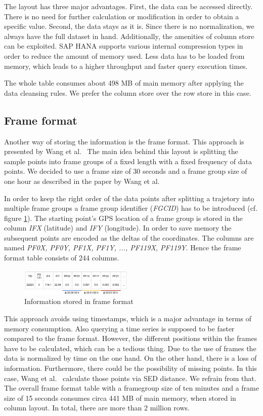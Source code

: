 \documentclass[10pt]{sig-alternate}
\begin{document}
The layout has three major advantages. First, the data can be accessed directly. There is no need for further calculation or modification in order to obtain a specific value. Second, the data stays as it is. Since there is no normalization, we always have the full dataset in hand. Additionally, the amenities of column store can be exploited. SAP HANA supports various internal compression types in order to reduce the amount of memory used. Less data has to be loaded from memory, which leads to a higher throughput and faster query execution times.

The whole table consumes about 498 MB of main memory after applying the data cleansing rules. We prefer the column store over the row store in this case.

\subsection{Frame format}
Another way of storing the information is the frame format. This approach is presented by Wang et al.~\cite{wang} The main idea behind this layout is splitting the sample points into frame groups of a fixed length with a fixed frequency of data points. We decided to use a frame size of 30 seconds and a frame group size of one hour as described in the paper by Wang et al.

In order to keep the right order of the data points after splitting a trajetory into multiple frame groups a frame group identifier (\textit{FGCID}) has to be introduced (cf. figure \ref{fig:frame_format}). The starting point's GPS location of a frame group is stored in the column \textit{IFX} (latitude) and \textit{IFY} (longitude). In order to save memory the subsequent points are encoded as the deltas of the coordinates. The columns are named \textit{PF0X, PF0Y, PF1X, PF1Y, ..., PF119X, PF119Y}. Hence the frame format table consists of 244 columns.

\begin{figure}[ht]
\centering
\includegraphics[width=0.48\textwidth]{img/frame_format.png}
\caption{Information stored in frame format}
\label{fig:frame_format}
\end{figure}

This approach avoids using timestamps, which is a major advantage in terms of memory consumption. Also querying a time series is supposed to be faster compared to the frame format. However, the different positions within the frames have to be calculated, which can be a tedious thing. Due to the use of frames the data is normalized by time on the one hand. On the other hand, there is a loss of information. Furthermore, there could be the possibility of missing points. In this case, Wang et al.~\cite{wang} calculate those points via SED distance. We refrain from that. The overall frame format table with a framegroup size of ten minutes and a frame size of 15 seconds consumes circa 441 MB of main memory, when stored in column layout. In total, there are more than 2 million rows.
\end{document}
